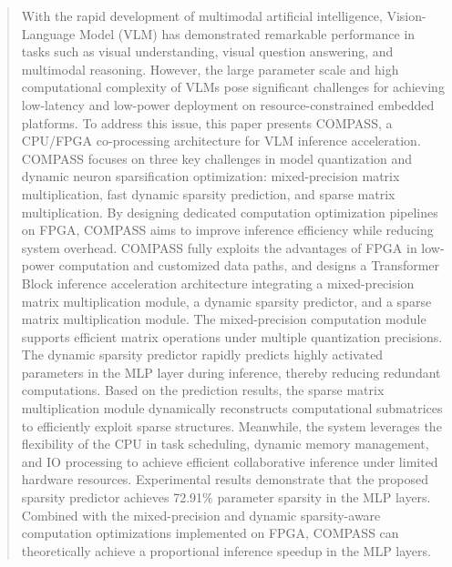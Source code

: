 \documentclass[sigconf]{acmart}
\begin{document}
\begin{abstract}
		With the rapid development of multimodal artificial intelligence, Vision-Language Model (VLM) has demonstrated remarkable performance in tasks such as visual understanding, visual question answering, and multimodal reasoning. However, the large parameter scale and high computational complexity of VLMs pose significant challenges for achieving low-latency and low-power deployment on resource-constrained embedded platforms. To address this issue, this paper presents COMPASS, a CPU/FPGA co-processing architecture for VLM inference acceleration. COMPASS focuses on three key challenges in model quantization and dynamic neuron sparsification optimization: mixed-precision matrix multiplication, fast dynamic sparsity prediction, and sparse matrix multiplication. By designing dedicated computation optimization pipelines on FPGA, COMPASS aims to improve inference efficiency while reducing system overhead. COMPASS fully exploits the advantages of FPGA in low-power computation and customized data paths, and designs a Transformer Block inference acceleration architecture integrating a mixed-precision matrix multiplication module, a dynamic sparsity predictor, and a sparse matrix multiplication module. The mixed-precision computation module supports efficient matrix operations under multiple quantization precisions. The dynamic sparsity predictor rapidly predicts highly activated parameters in the MLP layer during inference, thereby reducing redundant computations. Based on the prediction results, the sparse matrix multiplication module dynamically reconstructs computational submatrices to efficiently exploit sparse structures. Meanwhile, the system leverages the flexibility of the CPU in task scheduling, dynamic memory management, and IO processing to achieve efficient collaborative inference under limited hardware resources. Experimental results demonstrate that the proposed sparsity predictor achieves 72.91\% parameter sparsity in the MLP layers. Combined with the mixed-precision and dynamic sparsity-aware computation optimizations implemented on FPGA, COMPASS can theoretically achieve a proportional inference speedup in the MLP layers.
	\end{abstract}
	
	
	\maketitle
	
\end{document}
